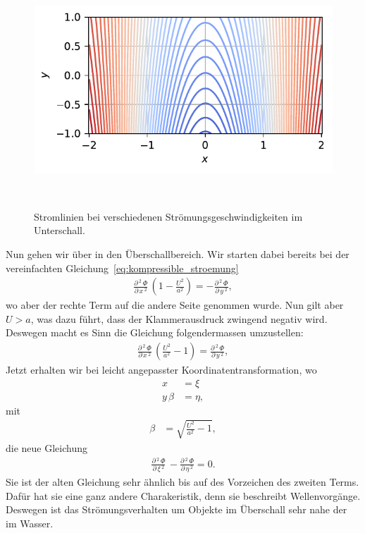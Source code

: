 \begin{figure}
\begin{minipage}[b]{0.32\textwidth}
        \caption*{$\beta = 0.81$ ; $U = 200\,\frac{\mathrm{m}}{\mathrm{s}}$}
    \end{minipage}
    \hfill
    \begin{minipage}[b]{0.32\textwidth}
        \centering
        \includegraphics[width=\linewidth]{papers/ueberschall/figures/abklingen_340.pdf}
        \caption*{$\beta = 0$ ; $U = a$}
    \end{minipage}
    \caption{Stromlinien bei verschiedenen Strömungsgeschwindigkeiten im Unterschall.}
~\label{fig:abklingen_stromlinie}
\end{figure}

Nun gehen wir über in den Überschallbereich.
Wir starten dabei bereits bei der vereinfachten 
Gleichung~\eqref{eq:kompressible_stroemung}
\begin{align*}
    \frac{\partial\,^2\,\Phi}{\partial\,x\,^2}\,
    \left(1-\frac{U^2}{a^2}\right)
    =
    -\frac{\partial\,^2\,\Phi}{\partial\,y\,^2},
\end{align*}
wo aber der rechte Term auf die andere Seite genommen wurde.
Nun gilt aber $U>a$, was dazu führt, dass der Klammerausdruck
zwingend negativ wird.
Deswegen macht es Sinn die Gleichung folgendermassen umzustellen:
\begin{align*}
    \frac{\partial\,^2\,\Phi}{\partial\,x\,^2}\,
    \left(\frac{U^2}{a^2}-1\right)
    =
    \frac{\partial\,^2\,\Phi}{\partial\,y\,^2},
\end{align*}
Jetzt erhalten wir bei leicht angepasster 
Koordinatentransformation, wo
\begin{align*}
    x 
    &=
    \xi \\
    y\,\beta
    &=
    \eta,
\end{align*}
mit
\begin{align*}
    \beta
    &=
    \sqrt{\frac{U^2}{a^2}-1},
\end{align*}
die neue Gleichung
\begin{align*}
    \frac{\partial\,^2\,\Phi}{\partial\,\xi\,^2}\,
    -
    \frac{\partial\,^2\,\Phi}{\partial\,\eta\,^2}
    =
    0.
\end{align*}
Sie ist der alten Gleichung sehr ähnlich bis auf des Vorzeichen
des zweiten Terms.
Dafür hat sie eine ganz andere Charakeristik,
denn sie beschreibt Wellenvorgänge.
Deswegen ist das Strömungsverhalten um Objekte im Überschall
sehr nahe der im Wasser.